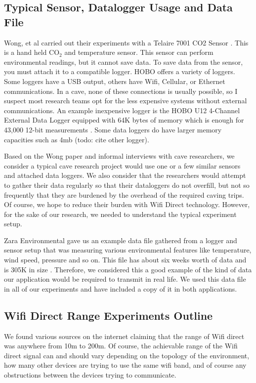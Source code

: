 \documentclass[10pt,twocolumn]{article}
\begin{document}
\subsection{Typical Sensor, Datalogger Usage and Data File}
Wong, et al carried out their experiments with a Telaire 7001 CO2 Sensor \cite{telaire} \cite{wong2010}. 
This is a hand held CO$_2$ and temperature sensor.
This sensor can perform environmental readings, but it cannot save data.
To save data from the sensor, you must attach it to a compatible logger.
HOBO offers a variety of loggers.
Some loggers have a USB output, others have Wifi, Cellular, or Ethernet communications.
In a cave, none of these connections is usually possible, so I suspect most research teams opt for the less expensive systems without external communications.
An example inexpensive logger is the HOBO U12 4-Channel External Data Logger equipped with 64K bytes of memory which is enough for 43,000 12-bit measurements \cite{logger}. 
Some data loggers do have larger memory capacities such as 4mb (todo: cite other logger).

Based on the Wong paper and informal interviews with cave researchers, we consider a typical cave research project would use one or a few similar sensors and attached data loggers.
We also consider that the researchers would attempt to gather their data regularly so that their dataloggers do not overfill, but not so frequently that they are burdened by the overhead of the required caving trips.
Of course, we hope to reduce their burden with Wifi Direct technology.
However, for the sake of our research, we needed to understand the typical experiment setup.

Zara Environmental gave us an example data file gathered from a logger and sensor setup that was measuring various environmental features like temperature, wind speed, pressure and so on.
This file has about six weeks worth of data and is 305K in size \cite{datafile}.
Therefore, we considered this a good example of the kind of data our application would be required to transmit in real life.
We used this data file in all of our experiments and have included a copy of it in both applications.

\subsection{Wifi Direct Range Experiments Outline}
We found various sources on the internet claiming that the range of Wifi direct was anywhere from 10m to 200m. 
Of course, the achievable range of the Wifi direct signal can and should vary depending on the topology of the environment, how many other devices are trying to use the same wifi band, and of course any obstructions between the devices trying to communicate.
\end{document}
